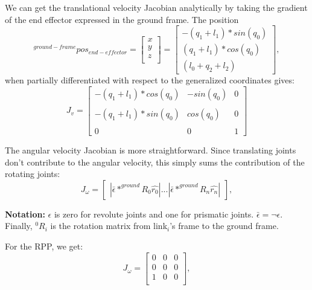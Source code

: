 \documentclass[12pt]{article}
\begin{document}
We can get the translational velocity Jacobian analytically by taking the gradient of the
end effector expressed in the ground frame. The position\\
\begin{equation}
  ^{ground-frame}pos_{end-effector}
  =
  \begin{bmatrix} x \\ y \\ z \\ \end{bmatrix} 
  = 
  \begin{bmatrix} 
    -(q_1 + l_1) * sin(q_0) \\
    (q_1 + l_1) * cos(q_0) \\
    (l_0+q_2 + l_2)
  \end{bmatrix},
\end{equation}
when partially differentiated with respect to the generalized coordinates gives:
\begin{equation}
  J_v = 
  \begin{bmatrix} 
    -(q_1 + l_1) * cos(q_0) & -sin(q_0) & 0 \\
    \\
    -(q_1 + l_1) * sin(q_0) & cos(q_0) & 0 \\ 
    \\
    0 & 0 & 1
  \end{bmatrix}
\end{equation}

The angular velocity Jacobian is more straightforward. Since translating joints don't
contribute to the angular velocity, this simply sums the contribution of the
rotating joints:
\begin{equation}
  J_\omega = 
  \begin{bmatrix} 
   | \bar{\epsilon} * ^{ground}R_0 \hat{r_0} | ... | \bar{\epsilon} * ^{ground}R_n \hat{r_n} |
  \end{bmatrix},
\end{equation}

{\bf Notation:} $\epsilon$ is zero for revolute joints and one for prismatic joints. 
$\bar{\epsilon} = \neg \epsilon$. Finally, $^0R_i$ is the rotation matrix from 
link$_i$'s frame to the ground frame.

For the RPP, we get:
\begin{equation}
  J_\omega = 
  \begin{bmatrix} 
    0 & 0 & 0 \\
    0 & 0 & 0 \\
    1 & 0 & 0 \\
  \end{bmatrix},
\end{equation}
\end{document}
